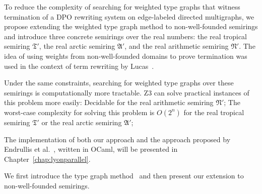 To reduce the complexity of searching for weighted type graphs that witness termination of a DPO rewriting system on edge-labeled directed multigraphs, we propose extending the weighted type graph method to non-well-founded semirings and introduce three concrete semirings over the real numbers: the real tropical semiring $\mathfrak{T}'$, the real arctic semiring $\mathfrak{A}'$, and the real arithmetic semiring $\mathfrak{N}'$. The idea of using weights from non-well-founded domains to prove termination was used in the context of term rewriting by Lucas~\cite{lucas2006relative}.

Under the same constraints, searching for weighted type graphs over these semirings is computationally more tractable.
Z3 can solve practical instances of this problem more easily: Decidable for the real arithmetic semiring $\mathfrak{N}'$;
The worst-case complexity for solving this problem is $O(2^n)$ for the real tropical semiring $\mathfrak{T}'$ or the real arctic semiring $\mathfrak{A}'$;

The implementation of both our approach and the approach proposed by Endrullis et al.~\cite{endrullis2024generalized_icgt}, written in OCaml, will be presented in Chapter~\ref{chap:lyonparallel}.

We first introduce the type graph method~\cite{endrullis2024generalized_icgt} and then present our extension to non-well-founded semirings.